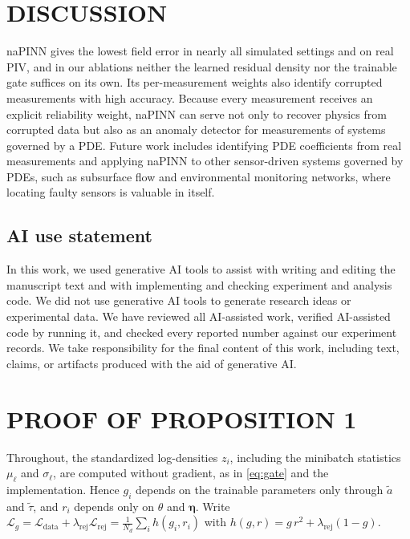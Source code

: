 \documentclass[twoside]{article}
\newcommand{\rej}{\lambda_{\mathrm{rej}}}
\begin{document}
\section{DISCUSSION}
\label{sec:discussion}

naPINN gives the lowest field error in nearly all simulated settings and on
real PIV, and in our ablations neither the learned residual density nor the
trainable gate suffices on its own. Its per-measurement weights also identify
corrupted measurements with high accuracy. Because every measurement receives
an explicit reliability weight, naPINN can serve not only to recover physics
from corrupted data but also as an anomaly detector for measurements of systems
governed by a PDE. Future work includes identifying PDE coefficients from real
measurements and applying naPINN to other sensor-driven systems governed by
PDEs, such as subsurface flow and environmental monitoring networks, where
locating faulty sensors is valuable in itself.

\subsection*{AI use statement}
In this work, we used generative AI tools to assist with writing and editing
the manuscript text and with implementing and checking experiment and analysis
code. We did not use generative AI tools to generate research ideas or
experimental data. We have reviewed all AI-assisted work, verified
AI-assisted code by running it, and checked every reported number against our
experiment records. We take responsibility for the final content of this work,
including text, claims, or artifacts produced with the aid of generative AI.




\clearpage
\appendix
\thispagestyle{empty}
\onecolumn
{}

\section{PROOF OF PROPOSITION 1}
\label{app:proof}

Throughout, the standardized log-densities $z_i$, including the minibatch
statistics $\mu_\ell$ and $\sigma_\ell$, are computed without gradient, as in
\cref{eq:gate} and the implementation. Hence $g_i$ depends on the trainable
parameters only through $\tilde a$ and $\tilde\tau$, and $r_i$ depends only on
$\theta$ and $\boldsymbol\eta$. Write
$\mathcal{L}_g = \mathcal{L}_{\mathrm{data}} + \rej\mathcal{L}_{\mathrm{rej}}
= \frac{1}{N_d}\sum_i h(g_i, r_i)$ with $h(g, r) = g\,r^2 + \rej(1-g)$.
\end{document}
